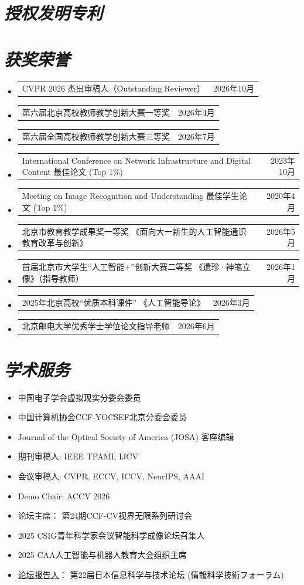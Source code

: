 \documentclass[UTF8,fontset=fandol]{ctexart}
\makeatletter
\newcommand{\resumeProjectHeading}[2]{
	\item
	\begin{tabular*}{0.97\textwidth}{l@{\extracolsep{\fill}}r}
		 #1 & \small #2 \\
	\end{tabular*}\vspace{-7pt}
}
\newcommand{\resumeSubHeadingListStart}{\begin{itemize}[leftmargin=0.15in, label={}]}
\newcommand{\resumeSubHeadingListEnd}{\end{itemize}}
\makeatother
\begin{document}
	\section{\textit{\textbf{授权发明专利}}}
	
	
	
	\section{\textit{\textbf{获奖荣誉}}}
	\resumeSubHeadingListStart
	\resumeProjectHeading
	{CVPR 2026 杰出审稿人（Outstanding Reviewer）}{2026年10月}

	\resumeProjectHeading
	{第六届北京高校教师教学创新大赛一等奖}{2026年4月}

	\resumeProjectHeading
	{第六届全国高校教师教学创新大赛三等奖}{2026年7月}

	\resumeProjectHeading
	{International Conference on Network Infrastructure and Digital Content 最佳论文 (Top 1\%)}{2023年10月}
	
	\resumeProjectHeading
	{Meeting on Image Recognition and Understanding 最佳学生论文 (Top 1\%)}{2020年4月}
	
	\resumeProjectHeading
	{北京市教育教学成果奖一等奖 《面向大一新生的人工智能通识教育改革与创新》}{2026年5月}
	
	\resumeProjectHeading
	{首届北京市大学生“人工智能+”创新大赛二等奖 《遗珍·神笔立像》（指导教师）}{2026年1月}
	
	\resumeProjectHeading
	{2025年北京高校“优质本科课件” 《人工智能导论》}{2026年3月}

	\resumeProjectHeading
	{北京邮电大学优秀学士学位论文指导老师}{2026年6月}
	
	\resumeSubHeadingListEnd
	
	\section{\textit{\textbf{学术服务}}}
	\begin{itemize}
		\item 中国电子学会虚拟现实分委会委员
		\item 中国计算机协会CCF-YOCSEF北京分委会委员
		\item Journal of the Optical Society of America (JOSA) 客座编辑
		\item 期刊审稿人: IEEE TPAMI, IJCV
		\item 会议审稿人: CVPR, ECCV, ICCV, NeurIPS, AAAI
		\item Demo Chair: ACCV 2026
		\item 论坛主席： 第24期CCF-CV视界无限系列研讨会
		\item 2025 CSIG青年科学家会议智能科学成像论坛召集人
		\item 2025 CAA人工智能与机器人教育大会组织主席
		\item  \href{https://gakkai-web.net/fit/program_web/event_TCS4-2.html}{\underline{论坛报告人}}： 第22届日本信息科学与技术论坛 ({情報科学技術フォーラム})
	\end{itemize}



	
\end{document}
